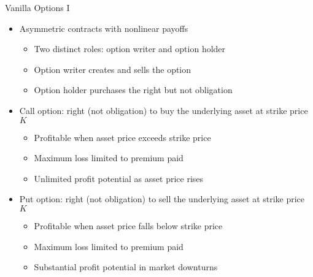 \documentclass[10pt]{beamer}
\begin{document}
\begin{frame}{Vanilla Options I}
  \begin{itemize}[<+->]
    \item Asymmetric contracts with nonlinear payoffs
      \begin{itemize}
        \item Two distinct roles: option writer and option holder
        \item Option writer creates and sells the option
        \item Option holder purchases the right but not obligation
      \end{itemize}
    \item Call option: right (not obligation) to buy the underlying asset at strike price $K$
      \begin{itemize}
        \item Profitable when asset price exceeds strike price
        \item Maximum loss limited to premium paid
        \item Unlimited profit potential as asset price rises
      \end{itemize}
    \item Put option: right (not obligation) to sell the underlying asset at strike price $K$
      \begin{itemize}
        \item Profitable when asset price falls below strike price
        \item Maximum loss limited to premium paid
        \item Substantial profit potential in market downturns
      \end{itemize}
  \end{itemize}
\end{frame}
\end{document}

